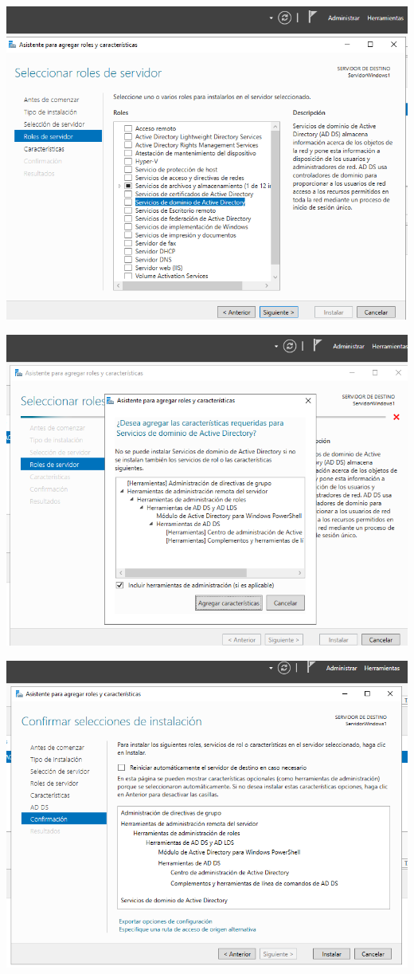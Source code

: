 \documentclass[
  a4paper,
]{article}
\begin{document}
\includegraphics{png/instalAD3.png}

\includegraphics{png/instalAD4.png}

\includegraphics{png/instalAD5.png}
\end{document}
